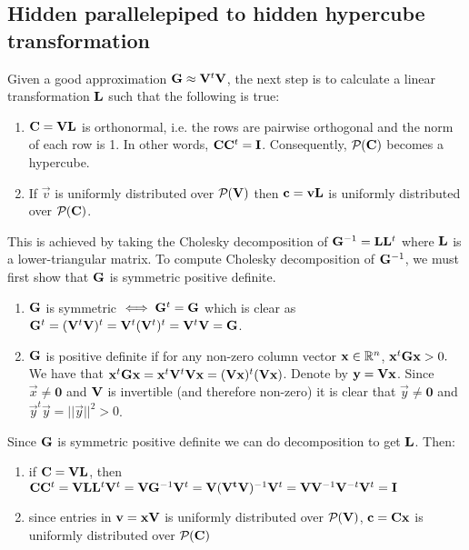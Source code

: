\subsection{Hidden parallelepiped to hidden hypercube transformation}
Given a good approximation $\mathbf{G} \approx \mathbf{V}^t \mathbf{V}$, the next step is to calculate a linear transformation $\mathbf{L}$ such that the following is true:
\begin{enumerate}
    \item $\mathbf{C} = \mathbf{V}\mathbf{L}$ is orthonormal, i.e. the rows are pairwise orthogonal and the norm of each row is 1. In other words, $\mathbf{C} \mathbf{C}^t = \mathbf{I}$. 
        Consequently, $\mathcal{P}_{}(\mathbf{C})$ becomes a hypercube.
    \item If $\vec{v}$ is uniformly distributed over $\mathcal{P}_{}(\mathbf{V})$ then $\mathbf{c} = \mathbf{v} \mathbf{L}$ is uniformly distributed over $\mathcal{P}_{}(\mathbf{C})$.
\end{enumerate}
This is achieved by taking the Cholesky decomposition of $\mathbf{G}^{-1} = \mathbf{L} \mathbf{L}^t$ where $\mathbf{L}$ is a lower-triangular matrix. 
To compute Cholesky decomposition of $\mathbf{G}^{-1}$, we must first show that $\mathbf{G}$ is symmetric positive definite.
\begin{enumerate}
    \item $\mathbf{G}$ is symmetric $\iff \mathbf{G}^{t}= \mathbf{G}$ which is clear as $\mathbf{G}^t = (\mathbf{V}^t\mathbf{V})^t = \mathbf{V}^t (\mathbf{V}^{t})^t= \mathbf{V}^t \mathbf{V} = \mathbf{G}$.
    \item $\mathbf{G}$ is positive definite if for any non-zero column vector $\mathbf{x} \in \mathbb{R}^n$, $\mathbf{x}^t \mathbf{G} \mathbf{x} > 0.$
We have that $\mathbf{x}^t \mathbf{G} \mathbf{x} = \mathbf{x}^t \mathbf{V}^t \mathbf{V} \mathbf{x} = (\mathbf{V} \mathbf{x})^t (\mathbf{V} \mathbf{x})$. Denote by $\mathbf{y} = \mathbf{V} \mathbf{x}$.
Since $\vec{x} \neq \mathbf{0}$ and $\mathbf{V}$ is invertible (and therefore non-zero) it is clear that 
$\vec{y} \neq \mathbf{0}$ and $\vec{y}^t \vec{y} = \lvert \vert{\vec{y}} \rvert \vert ^2 > 0$.
\end{enumerate}
Since $\mathbf{G}$ is symmetric positive definite we can do decomposition to get $\mathbf{L}$. Then: 
\begin{enumerate}
    \item if $\mathbf{C} = \mathbf{V} \mathbf{L}$, then $\mathbf{C} \mathbf{C}^t = \mathbf{V} \mathbf{L} \mathbf{L}^t \mathbf{V}^t = \mathbf{V} \mathbf{G}^{-1} \mathbf{V}^t = \mathbf{V} (\mathbf{V^t}\mathbf{V})^{-1} \mathbf{V}^t
        = \mathbf{V} \mathbf{V}^{-1} \mathbf{V}^{-t} \mathbf{V}^t = \mathbf{I}$
    \item since entries in $\mathbf{v} = \mathbf{x} \mathbf{V}$ is uniformly distributed over $\mathcal{P}_{}(\mathbf{V})$, $\mathbf{c} = \mathbf{C} \mathbf{x}$ is uniformly distributed over $\mathcal{P}_{}(\mathbf{C})$
\end{enumerate}

